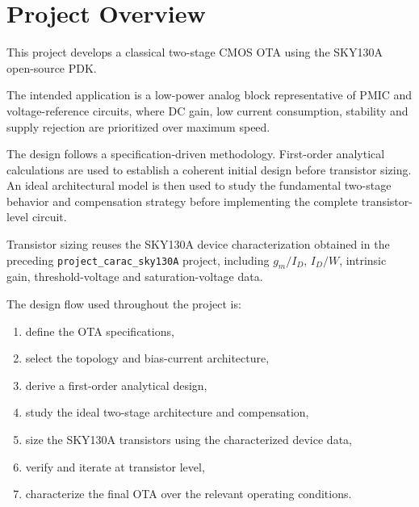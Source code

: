 
\section{Project Overview}

This project develops a classical two-stage CMOS OTA using the SKY130A
open-source PDK.

The intended application is a low-power analog block representative of
PMIC and voltage-reference circuits, where DC gain, low current
consumption, stability and supply rejection are prioritized over
maximum speed.

The design follows a specification-driven methodology. First-order
analytical calculations are used to establish a coherent initial design
before transistor sizing. An ideal architectural model is then used to
study the fundamental two-stage behavior and compensation strategy
before implementing the complete transistor-level circuit.

Transistor sizing reuses the SKY130A device characterization obtained in
the preceding \texttt{project\_carac\_\allowbreak sky130A} project, including
$g_m/I_D$, $I_D/W$, intrinsic gain, threshold-voltage and saturation-voltage
data.

The design flow used throughout the project is:

\begin{enumerate}
    \item define the OTA specifications,
    \item select the topology and bias-current architecture,
    \item derive a first-order analytical design,
    \item study the ideal two-stage architecture and compensation,
    \item size the SKY130A transistors using the characterized device data,
    \item verify and iterate at transistor level,
    \item characterize the final OTA over the relevant operating conditions.
\end{enumerate}
